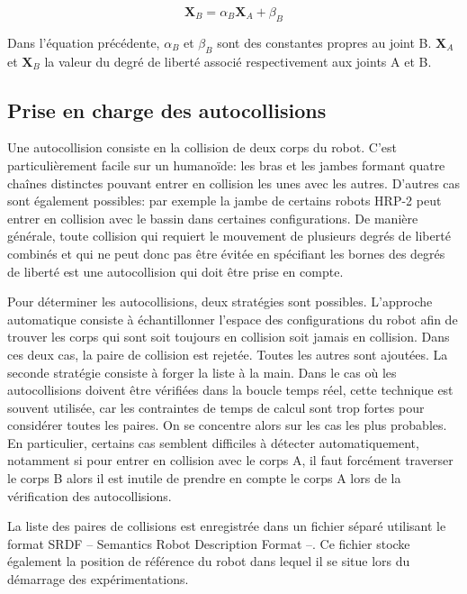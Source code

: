 \begin{equation}
  \mathbf{X}_B = \alpha_B \mathbf{X}_A + \beta_B
\end{equation}

Dans l'équation précédente, $\alpha_B$ et $\beta_B$ sont des
constantes propres au joint B. $\mathbf{X}_A$ et $\mathbf{X}_B$ la
valeur du degré de liberté associé respectivement aux joints A et B.


\subsection{Prise en charge des autocollisions}

Une autocollision consiste en la collision de deux corps du
robot. C'est particulièrement facile sur un humanoïde: les bras et les
jambes formant quatre chaînes distinctes pouvant entrer en collision
les unes avec les autres. D'autres cas sont également possibles: par
exemple la jambe de certains robots HRP-2 peut entrer en collision
avec le bassin dans certaines configurations. De manière générale,
toute collision qui requiert le mouvement de plusieurs degrés de
liberté combinés et qui ne peut donc pas être évitée en spécifiant les
bornes des degrés de liberté est une autocollision qui doit être prise
en compte.

Pour déterminer les autocollisions, deux stratégies sont
possibles. L'approche automatique consiste à échantillonner l'espace
des configurations du robot afin de trouver les corps qui sont soit
toujours en collision soit jamais en collision. Dans ces deux cas, la
paire de collision est rejetée. Toutes les autres sont ajoutées.  La
seconde stratégie consiste à forger la liste à la main. Dans le cas où
les autocollisions doivent être vérifiées dans la boucle temps réel,
cette technique est souvent utilisée, car les contraintes de temps de
calcul sont trop fortes pour considérer toutes les paires. On se
concentre alors sur les cas les plus probables. En particulier,
certains cas semblent difficiles à détecter automatiquement, notamment
si pour entrer en collision avec le corps A, il faut forcément
traverser le corps B alors il est inutile de prendre en compte le
corps A lors de la vérification des autocollisions.

La liste des paires de collisions est enregistrée dans un fichier
séparé utilisant le format SRDF -- Semantics Robot Description Format
--. Ce fichier stocke
également la position de référence du robot dans lequel il se situe
lors du démarrage des expérimentations.


